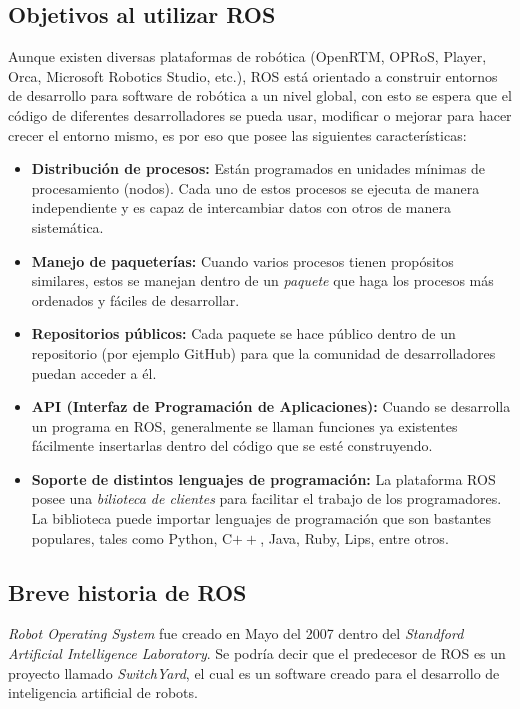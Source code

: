 		\subsection*{Objetivos al utilizar ROS}
Aunque existen diversas plataformas de robótica (OpenRTM, OPRoS, Player, Orca, Microsoft Robotics Studio, etc.), ROS está orientado a construir entornos de desarrollo para software de robótica a un nivel global, con esto se espera que el código de diferentes desarrolladores se pueda usar, modificar o mejorar para hacer crecer el entorno mismo, es por eso que posee las siguientes características:

\begin{itemize}
\item \textbf{Distribución de procesos:}
Están programados en unidades mínimas de procesamiento (nodos). Cada uno de estos procesos se ejecuta de manera independiente y es capaz de intercambiar datos con otros de manera sistemática.  
\item \textbf{Manejo de paqueterías:}
Cuando varios procesos tienen propósitos similares, estos se manejan dentro de un \textit{paquete} que haga los procesos más ordenados y fáciles de desarrollar.
\item \textbf{Repositorios públicos:}
Cada paquete se hace público dentro de un repositorio (por ejemplo GitHub) para que la comunidad de desarrolladores puedan acceder a él. 
\item \textbf{API (Interfaz de Programación de Aplicaciones):}
Cuando se desarrolla un programa en ROS, generalmente se llaman funciones ya existentes fácilmente insertarlas dentro del código que se esté construyendo.
\item \textbf{Soporte de distintos lenguajes de programación:}
La plataforma ROS posee una \textit{bilioteca de clientes} para facilitar el trabajo de los programadores. La biblioteca puede importar lenguajes de programación que son bastantes populares, tales como Python, C$++$, Java, Ruby, Lips, entre otros.
\end{itemize}
		\subsection*{Breve historia de ROS}
\textit{Robot Operating System} fue creado en Mayo del 2007 dentro del \textit{Standford Artificial Intelligence Laboratory}. Se podría decir que el predecesor de ROS es un proyecto llamado \textit{SwitchYard}, el cual es un software creado para el desarrollo de inteligencia artificial de robots.

